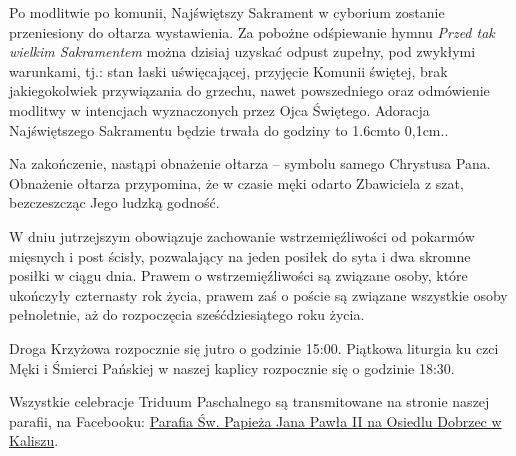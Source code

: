 \documentclass[10pt,oneside,final,notitlepage,a4paper,wide]{mwart}
\def\dotfill#1{\cleaders\hbox to #1{.}\hfill}
\newcommand\dotline[2][0,1cm]{\leavevmode\hbox to #2{\dotfill{#1}\hfil}}
\begin{document}
Po modlitwie po komunii, Najświętszy Sakrament w cyborium zostanie przeniesiony do ołtarza wystawienia. Za pobożne odśpiewanie hymnu \emph{Przed tak wielkim Sakramentem} można dzisiaj uzyskać odpust zupełny, pod zwykłymi warunkami, tj.: stan łaski uświęcającej, przyjęcie Komunii świętej, brak jakiegokolwiek przywiązania do grzechu, nawet powszedniego oraz odmówienie modlitwy w intencjach wyznaczonych przez Ojca Świętego. Adoracja Najświętszego Sakramentu będzie trwała do godziny \dotline{1.6cm}.

Na zakończenie, nastąpi obnażenie ołtarza -- symbolu samego Chrystusa Pana. Obnażenie ołtarza przypomina, że w czasie męki odarto Zbawiciela z szat, bezczeszcząc Jego ludzką godność. \bigskip

W dniu jutrzejszym obowiązuje zachowanie wstrzemięźliwości od pokarmów mięsnych i post ścisły, pozwalający na jeden posiłek do syta i dwa skromne posiłki w ciągu dnia. Prawem o wstrzemięźliwości są związane osoby, które ukończyły czternasty rok życia, prawem zaś o poście są związane wszystkie osoby pełnoletnie, aż do rozpoczęcia sześćdziesiątego roku życia. \medskip

Droga Krzyżowa rozpocznie się jutro o godzinie 15:00. Piątkowa liturgia ku czci Męki i Śmierci Pańskiej w naszej kaplicy rozpocznie się o godzinie 18:30.

Wszystkie celebracje Triduum Paschalnego są transmitowane na stronie naszej parafii, na Facebooku: \href{https://www.facebook.com/Parafia-\%C5\%9Aw-Papie\%C5\%BCa-Jana-Paw\%C5\%82a-II-na-Osiedlu-Dobrzec-w-Kaliszu-104456801212546/}{Parafia Św. Papieża Jana Pawła II na Osiedlu Dobrzec w Kaliszu}.
\end{document}
